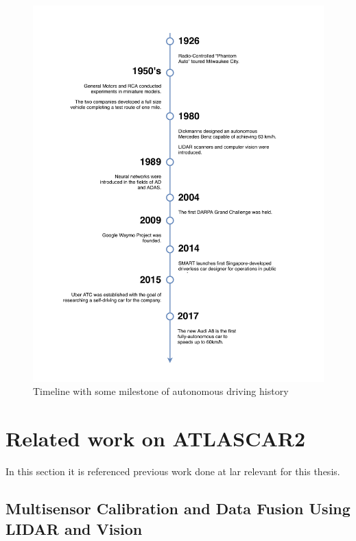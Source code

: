 \begin{figure}[htp]
	
	\centering
	\includegraphics[width=1\textwidth]{capstate/imgs/timeline.pdf}
	
	\caption{Timeline with some milestone of autonomous driving history}
	\label{fig:timeline}
	
\end{figure}

\section{Related work on ATLASCAR2}

In this section it is referenced previous work done at \gls{lar} relevant for this thesis.

\subsection{Multisensor Calibration and Data Fusion Using LIDAR and Vision} 

